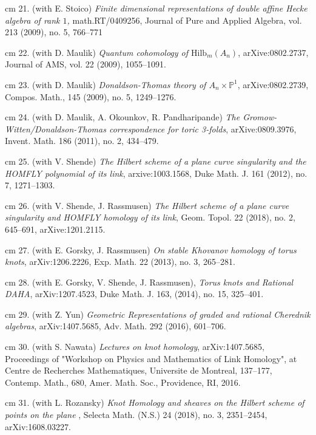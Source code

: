\documentclass[11pt]{amsart}
\theoremstyle{plain}
\theoremstyle{definition}
\theoremstyle{remark}
\begin{document}
\noindent{} cm 21. (with E. Stoico) {\it Finite dimensional representations of
double affine Hecke algebra of rank $1$,} math.RT/0409256,
 Journal of Pure and Applied Algebra,  vol. 213  (2009),  no. 5, 766--771

\noindent{} cm 22. (with D. Maulik) {\it Quantum cohomology of
$\mathrm{Hilb}_m(A_n)$}, arXive:0802.2737, Journal of AMS, vol. 22  (2009), 1055--1091. 

\noindent{} cm 23. (with D. Maulik) {\it Donaldson-Thomas theory
of $A_n\times\mathbb{P}^1$}, arXive:0802.2739,  Compos. Math., 145 (2009), no. 5, 1249--1276.

\noindent{} cm 24. (with D. Maulik, A. Okounkov, R. Pandharipande)
{\it The Gromow-Witten/Donaldson-Thomas correspondence for toric 3-folds},
arXive:0809.3976, Invent. Math. 186 (2011), no. 2, 434--479.

\noindent{} cm 25. (with V. Shende) 
{\it The Hilbert scheme of a plane curve singularity and the HOMFLY polynomial of its link}, arxive:1003.1568,
  Duke Math. J. 161 (2012), no. 7, 1271--1303.

\noindent{} cm 26. (with V. Shende, J. Rassmusen)
{\it The Hilbert scheme of a plane curve singularity and HOMFLY homology of its link},  Geom. Topol. 22 (2018), no. 2, 645--691, arXive:1201.2115.


\noindent{} cm 27. (with E. Gorsky, J. Rassmusen) {\it On stable Khovanov homology of torus knots},    arXiv:1206.2226,  Exp. Math. 22 (2013), no. 3, 265--281.

\noindent{} cm 28. (with E. Gorsky, V. Shende, J. Rassmusen), {\it Torus knots and Rational DAHA},   arXiv:1207.4523,  Duke Math. J. 163, (2014), no. 15, 325--401. 

\noindent{} cm 29. (with Z. Yun) {\it Geometric Representations of graded and rational Cherednik algebras},   arXiv:1407.5685,
 Adv. Math. 292 (2016), 601--706.

\noindent{} cm 30. (with S. Nawata) {\it Lectures on knot homology},   arXiv:1407.5685,   Proceedings of "Workshop on Physics and Mathematics of Link Homology", at Centre de Recherches Mathematiques, Universite de Montreal,  137--177, Contemp. Math., 680, Amer. Math. Soc., Providence, RI, 2016.


\noindent{} cm 31. (with L. Rozansky) {\it Knot Homology and sheaves on the Hilbert scheme of points on the plane },
Selecta Math. (N.S.) 24 (2018), no. 3, 2351--2454,  arXiv:1608.03227.
\end{document}
